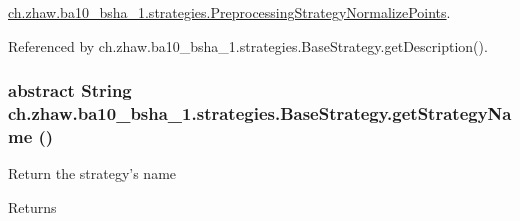 \hyperlink{classch_1_1zhaw_1_1ba10__bsha__1_1_1strategies_1_1PreprocessingStrategyNormalizePoints_a9b2a647c2f4d9702d943dbe8ef43485e}{ch.zhaw.ba10\_\-bsha\_\-1.strategies.PreprocessingStrategyNormalizePoints}.

Referenced by ch.zhaw.ba10\_\-bsha\_\-1.strategies.BaseStrategy.getDescription().\hypertarget{classch_1_1zhaw_1_1ba10__bsha__1_1_1strategies_1_1BaseStrategy_aa0ebed55eed45409bad13d43a0058780}{
\subsubsection[{getStrategyName}]{\setlength{\rightskip}{0pt plus 5cm}abstract String ch.zhaw.ba10\_\-bsha\_\-1.strategies.BaseStrategy.getStrategyName ()}}
\label{classch_1_1zhaw_1_1ba10__bsha__1_1_1strategies_1_1BaseStrategy_aa0ebed55eed45409bad13d43a0058780}
Return the strategy's name

\begin{DoxyReturn}{Returns}

\end{DoxyReturn}


